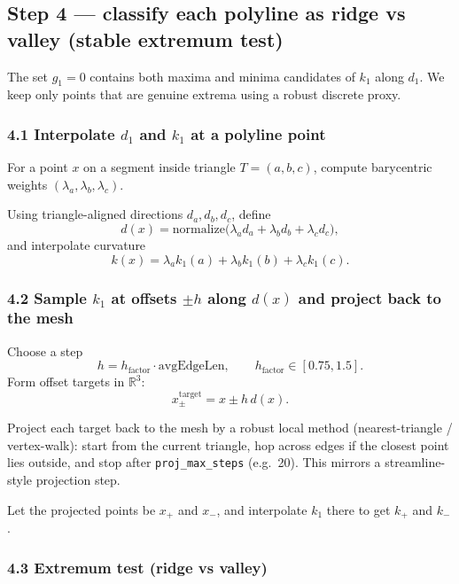 \documentclass[12pt,a4paper]{article}
\theoremstyle{plain}
\theoremstyle{definition}      %
\begin{document}
	
	\subsection*{Step 4 — classify each polyline as ridge vs valley (stable extremum test)}
	
	The set $g_1=0$ contains both maxima and minima candidates of $k_1$ along $d_1$.
	We keep only points that are genuine extrema using a robust discrete proxy.
	
	\subsubsection*{4.1 Interpolate $d_1$ and $k_1$ at a polyline point}
	
	For a point $x$ on a segment inside triangle $T=(a,b,c)$, compute barycentric weights
	$(\lambda_a,\lambda_b,\lambda_c)$.
	
	Using triangle-aligned directions $d_a,d_b,d_c$, define
	\[
	d(x)=\mathrm{normalize}\bigl(\lambda_a d_a + \lambda_b d_b + \lambda_c d_c\bigr),
	\]
	and interpolate curvature
	\[
	k(x)=\lambda_a k_1(a)+\lambda_b k_1(b)+\lambda_c k_1(c).
	\]
	
	\subsubsection*{4.2 Sample $k_1$ at offsets $\pm h$ along $d(x)$ and project back to the mesh}
	
	Choose a step
	\[
	h=h_{\mathrm{factor}}\cdot \mathrm{avgEdgeLen,
		\qquad } h_{\mathrm{factor}}\in[0.75,1.5].
	\]
	Form offset targets in $\mathbb{R}^3$:
	\[
	x_\pm^{\mathrm{target}}=x\pm h\,d(x).
	\]
	
	Project each target back to the mesh by a robust local method (nearest-triangle / vertex-walk):
	start from the current triangle, hop across edges if the closest point lies outside, and stop after
	\texttt{proj\_max\_steps} (e.g.\ 20). This mirrors a streamline-style projection step.
	
	Let the projected points be $x_+$ and $x_-$, and interpolate $k_1$ there to get $k_+$ and $k_-$.
	
	\subsubsection*{4.3 Extremum test (ridge vs valley)}
	
\end{document}
